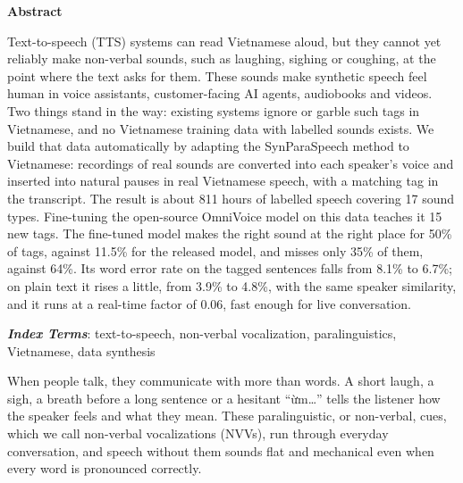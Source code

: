 \documentclass[a4paper]{article}
\makeatletter
\renewcommand{\normalsize}{\fontsize{13.5pt}{15.5pt}\selectfont}
\renewcommand{\section}{\@startsection{section}{1}{0pt}{7pt}{7pt}{\normalfont\normalsize\bfseries\centering}}
\makeatother
\begin{document}

{\centering\bfseries Abstract\par}
\vspace{3pt}
Text-to-speech (TTS) systems can read Vietnamese aloud, but
they cannot yet reliably make non-verbal sounds, such as laughing, sighing or coughing, at the
point where the text asks for them. These sounds make synthetic speech feel human in voice
assistants, customer-facing AI agents, audiobooks and videos. Two things stand in the way:
existing systems ignore or garble such tags in Vietnamese, and no Vietnamese training data with
labelled sounds exists. We build that data automatically by adapting the SynParaSpeech method
to Vietnamese: recordings of real sounds are converted into each speaker's voice and inserted
into natural pauses in real Vietnamese speech, with a matching tag in the transcript. The result
is about 811 hours of labelled speech covering 17 sound types. Fine-tuning the open-source
OmniVoice model on this data teaches it 15 new tags. The fine-tuned model makes the right sound
at the right place for 50\% of tags, against 11.5\% for the released model, and misses only 35\%
of them, against 64\%. Its word error rate on the tagged sentences falls from 8.1\% to 6.7\%; on
plain text it rises a little, from 3.9\% to 4.8\%, with the same speaker similarity, and it runs
at a real-time factor of 0.06, fast enough for live conversation.

\textbf{\textit{Index Terms}}: text-to-speech, non-verbal vocalization, paralinguistics,
Vietnamese, data synthesis

\section{Introduction}\label{sec:intro}
When people talk, they communicate with more than words. A short laugh, a sigh, a breath before
a long sentence or a hesitant ``ừm\ldots'' tells the listener how the speaker feels and what
they mean. These paralinguistic, or non-verbal, cues, which we call non-verbal vocalizations
(NVVs), run through everyday conversation, and speech without them sounds flat and mechanical
even when every word is pronounced correctly.
\end{document}
